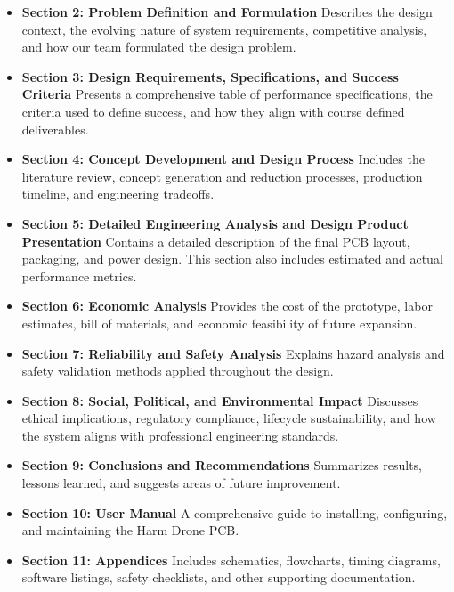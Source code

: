 \documentclass[12pt]{article}
\begin{document}
\begin{itemize}
\item \textbf{Section 2: Problem Definition and Formulation} \newline
Describes the design context, the evolving nature of system requirements, competitive analysis, and how our team formulated the design problem.

\item \textbf{Section 3: Design Requirements, Specifications, and Success Criteria} \newline
Presents a comprehensive table of performance specifications, the criteria used to define success, and how they align with course defined deliverables.

\item \textbf{Section 4: Concept Development and Design Process} \newline
Includes the literature review, concept generation and reduction processes, production timeline, and engineering tradeoffs.

\item \textbf{Section 5: Detailed Engineering Analysis and Design Product Presentation} \newline
Contains a detailed description of the final PCB layout, packaging, and power design. This section also includes estimated and actual performance metrics.

\item \textbf{Section 6: Economic Analysis} \newline
Provides the cost of the prototype, labor estimates, bill of materials, and economic feasibility of future expansion.

\item \textbf{Section 7: Reliability and Safety Analysis} \newline
Explains hazard analysis and safety validation methods applied throughout the design.

\item \textbf{Section 8: Social, Political, and Environmental Impact} \newline
Discusses ethical implications, regulatory compliance, lifecycle sustainability, and how the system aligns with professional engineering standards.

\item \textbf{Section 9: Conclusions and Recommendations} \newline
Summarizes results, lessons learned, and suggests areas of future improvement.

\item \textbf{Section 10: User Manual} \newline
A comprehensive guide to installing, configuring, and maintaining the Harm Drone PCB.

\item \textbf{Section 11: Appendices} \newline
Includes schematics, flowcharts, timing diagrams, software listings, safety checklists, and other supporting documentation.

\end{itemize}
\end{document}
